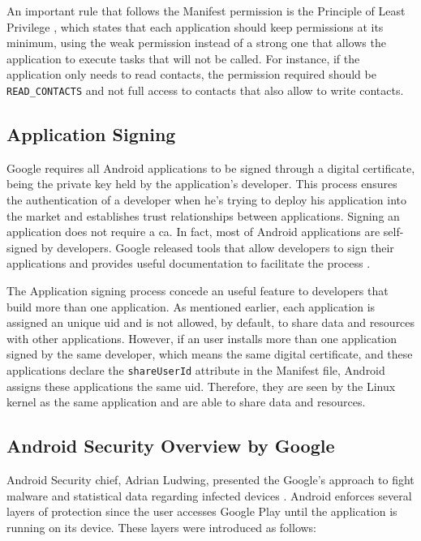 An important rule that follows the Manifest permission is the Principle of Least Privilege \cite{ApplicationSecurity:Oreilly}, which states that each application should keep permissions at its minimum, using the weak permission instead of a strong one that allows the application to execute tasks that will not be called. For instance, if the application only needs to read contacts, the permission required should be \texttt{READ\_CONTACTS} and not full access to contacts that also allow to write contacts.

\subsection{Application Signing}

Google requires all Android applications to be signed through a digital certificate, being the private key held by the application's developer. This process ensures the authentication of a developer when he's trying to deploy his application into the market and establishes trust relationships between applications. Signing an application does not require a \gls{ca}. In fact, most of Android applications are self-signed by developers. Google released tools that allow developers to sign their applications and provides useful documentation to facilitate the process \cite{AndroidSigning:Android}.


The Application signing process concede an useful feature to developers that build more than one application. As mentioned earlier, each application is assigned an unique \gls{uid} and is not allowed, by default, to share data and resources with other applications. However, if an user installs more than one application signed by the same developer, which means the same digital certificate, and these applications declare the \texttt{shareUserId} attribute in the Manifest file, Android assigns these applications the same \gls{uid}. Therefore, they are seen by the Linux kernel as the same application and are able to share data and resources.

\subsection{Android Security Overview by Google}

Android Security chief, Adrian Ludwing, presented the Google's approach to fight malware and statistical data regarding infected devices \cite{VBAndroidPracticalSecurity} . Android enforces several layers of protection since the user accesses Google Play until the application is running on its device. These layers were introduced as follows:

